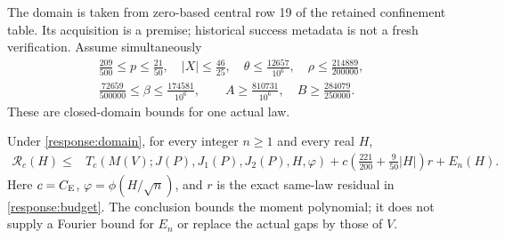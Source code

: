 The domain is taken from zero-based central row 19 of the retained
confinement table. Its acquisition is a premise; historical success
metadata is not a fresh verification. Assume simultaneously
\begin{gather}
 \frac{209}{500}\le p\le\frac{21}{50},\quad |X|\le\frac{46}{25},\quad
 \theta\le\frac{12657}{10^6},\quad \rho\le\frac{214889}{200000},\label{response:domain}\\
 \frac{72659}{500000}\le\beta\le\frac{174581}{10^6},\qquad
 A\ge\frac{810731}{10^6},\quad B\ge\frac{284079}{250000}.
 \nonumber
\end{gather}
These are closed-domain bounds for one actual law.

\begin{theorem}\label{response:theorem}
Under \eqref{response:domain}, for every integer $n\ge1$ and every real $H$,
\begin{align}
 \mathcal R_c(H)\le{}&T_c(M(V);J(P),J_1(P),J_2(P),H,\varphi)
       +c\left(\frac{221}{200}+\frac9{50}|H|\right)r+E_n(H).
 \label{response:main}
\end{align}
Here $c=C_{\mathrm E}$, $\varphi=\phi(H/\sqrt n)$, and $r$ is the exact same-law
residual in \eqref{response:budget}. The conclusion bounds the moment
polynomial; it does not supply a Fourier bound for $E_n$ or replace the
actual gaps by those of $V$.
\end{theorem}

